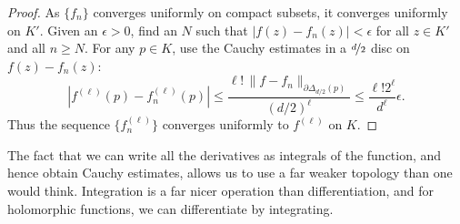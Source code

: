 \documentclass[12pt,openany]{book}
\newcommand{\sabs}[1]{\lvert {#1} \rvert}
\newcommand{\snorm}[1]{\lVert {#1} \rVert}
\newcommand{\abs}[1]{\left\lvert {#1} \right\rvert}
\theoremstyle{plain}
\theoremstyle{remark}
\theoremstyle{definition}
\theoremstyle{exercise}
\theoremstyle{example}
\begin{document}
\begin{proof}
As $\{ f_n \}$ converges uniformly on compact subsets, it converges uniformly
on $K'$.  Given an $\epsilon > 0$, find an $N$ such that 
$\sabs{f(z)-f_n(z)} < \epsilon$ for all $z \in K'$ and
all $n \geq N$.
For any $p \in K$, use the Cauchy estimates in a $\nicefrac{d}{2}$ disc
on $f(z)-f_n(z)$:
\begin{equation*}
\abs{
f^{(\ell)}(p)
-
f_n^{(\ell)}(p)
}
\leq
\frac{\ell! \, \snorm{f-f_n}_{\partial \Delta_{d/2}(p)}}{{(d/2)}^{\ell}}
\leq
\frac{\ell!2^\ell}{d^\ell}\epsilon .
\end{equation*}
Thus the sequence $\bigl\{ f_n^{(\ell)} \bigr\}$ converges uniformly to $f^{(\ell)}$ on $K$.
\end{proof}

The fact that we can write all the derivatives as
integrals of the function, and hence obtain Cauchy estimates,
allows us to use a far weaker topology than one would think.
Integration is a far nicer operation than differentiation, and for
holomorphic functions, we can differentiate by integrating.
\end{document}
